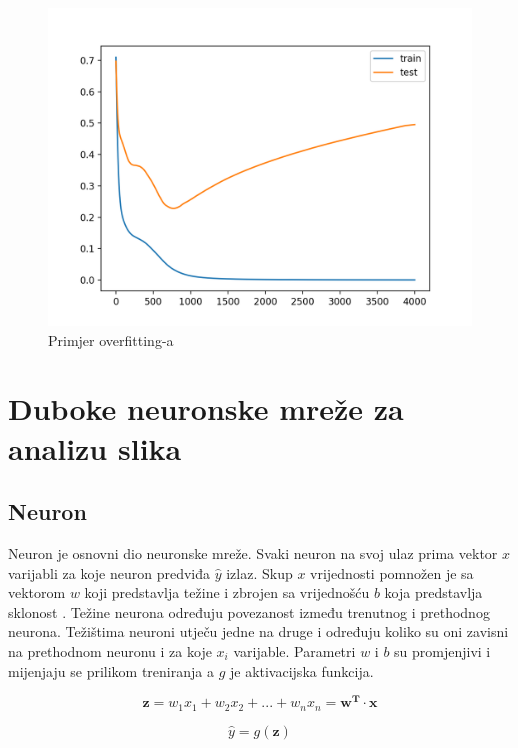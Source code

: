 \documentclass[times, utf8, zavrsni,numeric,pstricks]{fer}
\newcommand{\vect}[1]{\boldsymbol{#1}}
\begin{document}
\begin{figure}[H]
	\centering
	\includegraphics[width=\linewidth, height=0.3\paperheight, keepaspectratio]{overfitting.png}
	\caption{Primjer overfitting-a}
	\label{pic:overfitting}
\end{figure}


\section{Duboke neuronske mreže za analizu slika}
\subsection{Neuron}
Neuron je osnovni dio neuronske mreže. Svaki neuron na svoj ulaz prima vektor $x$ varijabli za koje neuron predviđa $\hat{y}$ izlaz. Skup $x$ vrijednosti pomnožen je sa vektorom $w$ koji predstavlja težine  i zbrojen sa vrijednošću $b$ koja predstavlja sklonost . Težine neurona određuju povezanost između trenutnog i prethodnog neurona. Težištima neuroni utječu jedne na druge i određuju koliko su oni zavisni na prethodnom neuronu i za koje $x_i$ varijable. Parametri $w$ i $b$ su promjenjivi i mijenjaju se prilikom treniranja a $g$ je aktivacijska funkcija.


\begin{equation}\label{eq:neuron}
	\vect{z}=w_1x_1+w_2x_2+...+w_nx_n=\vect{w^{T}} \cdot \vect{x}
\end{equation}

\begin{equation}\label{eq:neuron_activation}
	\hat{y} = g(\vect{z})
\end{equation}
\end{document}
